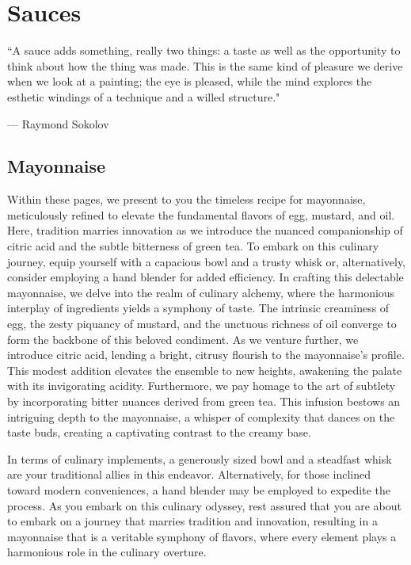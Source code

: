 \chapter{Sauces}
\epigraph{``A sauce adds something, really two things: a taste as well as the opportunity to think about how the thing was made. This is the same kind of pleasure we derive when we look at a painting; the eye is pleased, while the mind explores the esthetic windings of a technique and a willed structure."}{--- \textup{Raymond Sokolov}}

\section{Mayonnaise}
\label{mayonnaise}
Within these pages, we present to you the timeless recipe for mayonnaise, meticulously refined to elevate the fundamental flavors of egg, mustard, and oil. Here, tradition marries innovation as we introduce the nuanced companionship of citric acid and the subtle bitterness of green tea. To embark on this culinary journey, equip yourself with a capacious bowl and a trusty whisk or, alternatively, consider employing a hand blender for added efficiency. In crafting this delectable mayonnaise, we delve into the realm of culinary alchemy, where the harmonious interplay of ingredients yields a symphony of taste. The intrinsic creaminess of egg, the zesty piquancy of mustard, and the unctuous richness of oil converge to form the backbone of this beloved condiment. As we venture further, we introduce citric acid, lending a bright, citrusy flourish to the mayonnaise's profile. This modest addition elevates the ensemble to new heights, awakening the palate with its invigorating acidity. Furthermore, we pay homage to the art of subtlety by incorporating bitter nuances derived from green tea. This infusion bestows an intriguing depth to the mayonnaise, a whisper of complexity that dances on the taste buds, creating a captivating contrast to the creamy base.

In terms of culinary implements, a generously sized bowl and a steadfast whisk are your traditional allies in this endeavor. Alternatively, for those inclined toward modern conveniences, a hand blender may be employed to expedite the process. As you embark on this culinary odyssey, rest assured that you are about to embark on a journey that marries tradition and innovation, resulting in a mayonnaise that is a veritable symphony of flavors, where every element plays a harmonious role in the culinary overture.

